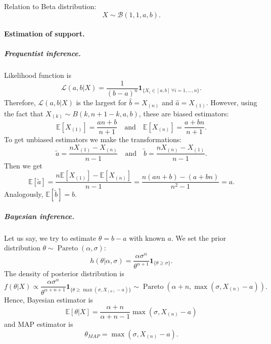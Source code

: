 \documentclass[a4paper,11pt]{article}
\theoremstyle{plain}
\theoremstyle{definition}
\newcommand{\ME}{\mathbb{E}}
\begin{document}
	Relation to Beta distribution: \[X \sim \mathcal{B}(1, 1, a, b). \]
	\paragraph{Estimation of support.}
	\subparagraph{Frequentist inference.} Likelihood function is
	\[
	\mathcal{L}(a, b | X) = \frac{1}{(b-a)^n} \mathbf{1}_{ \{ X_i \in [a, b] \ \forall i = 1, \dots, n \} }.
	\]
	Therefore, $\mathcal{L}(a, b | X)$ is the largest for $\hat{b} = X_{(n)}$ and $\hat{a} = X_{(1)}$. However, using the fact that $X_{(k)} \sim B(k, n+1-k, a, b)$, these are biased estimators:
	\[ \ME[X_{(1)}] = \frac{an + b}{n+1} \quad \text{and} \quad \ME[X_{(n)}] = \frac{a + bn}{n+1}.  \]
	To get unbiased estimators we make the transformations:
	\[ \tilde{a} = \frac{nX_{(1)} - X_{(n)} }{n-1} \quad \text{and} \quad  \tilde{b} = \frac{nX_{(n)} - X_{(1)} }{n-1}. \]
	Then we get
	\[ 
	\ME[\tilde{a}] = \frac{n\ME[X_{(1)}] - \ME[X_{(n)}]}{n-1} = \frac{n(an+b)-(a+bn)}{n^2-1} = a.
	\]
	Analogously, $\ME[\tilde{b}] = b$.
	\subparagraph{Bayesian inference.} Let us say, we try to estimate $\theta = b-a$ with known $a$. We set the prior distribution $\theta \sim \operatorname{Pareto}(\alpha, \sigma)$:
	\[
	h(\theta|\alpha, \sigma) = \frac{\alpha \sigma^\alpha}{\theta^{\alpha + 1}} \mathbf{1}_{\{\theta \geq \sigma\}}.
	\]
	The density of posterior distribution is
	\[
	f(\theta|X) \propto \frac{\alpha \sigma^\alpha}{\theta^{\alpha+n+1}} \mathbf{1}_{\{\theta \geq \max(\sigma, X_{(n)}-a) \}} \sim \operatorname{Pareto}(\alpha + n, \max(\sigma, X_{(n)}-a) ).
	\]
	Hence, Bayesian estimator is
	\[  
	\ME[\theta|X] = \frac{\alpha + n}{\alpha + n - 1}\max(\sigma, X_{(n)}-a)
	\]
	and MAP estimator is
	\[
	\theta_{MAP} = \max(\sigma, X_{(n)}-a).
	\]
	
	\pagebreak
\end{document}
